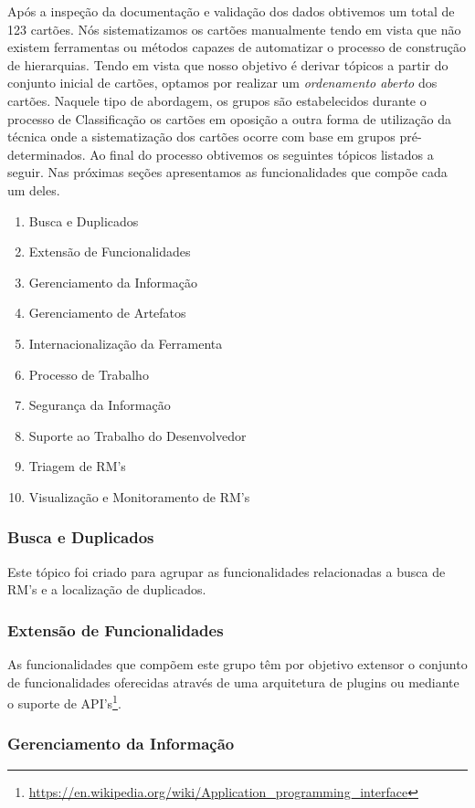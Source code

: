 Após a inspeção da documentação e validação dos dados obtivemos um total de 123
cartões. Nós sistematizamos os cartões manualmente tendo em vista que não
existem ferramentas ou métodos capazes de automatizar o processo de construção
de hierarquias. Tendo em vista que nosso objetivo é derivar tópicos a partir do
conjunto inicial de cartões, optamos por realizar um \textit{ordenamento aberto}
dos cartões.  Naquele tipo de abordagem, os grupos são estabelecidos durante o
processo de Classificação os cartões em oposição a outra forma de utilização da
técnica onde a sistematização dos cartões ocorre com base em grupos
pré-determinados.  Ao final do processo obtivemos os seguintes tópicos listados
a seguir. Nas próximas seções apresentamos as funcionalidades que compõe cada um
deles.

\begin{enumerate}
	\item{Busca e Duplicados}
	\item{Extensão de Funcionalidades}
	\item{Gerenciamento da Informação}
	\item{Gerenciamento de Artefatos}
	\item{Internacionalização da Ferramenta}
	\item{Processo de Trabalho}
	\item{Segurança da Informação}
	\item{Suporte ao Trabalho do Desenvolvedor}
	\item{Triagem de RM's}
	\item{Visualização e Monitoramento de RM's}
\end{enumerate}

\subsubsection{Busca e Duplicados}

Este tópico foi criado para agrupar as funcionalidades relacionadas a busca de
RM's e a localização de duplicados.
\subsubsection{Extensão de Funcionalidades}

As funcionalidades que compõem este grupo têm por objetivo extensor o conjunto
de funcionalidades oferecidas através de uma arquitetura de plugins ou mediante
o suporte de
API's\footnote{\url{https://en.wikipedia.org/wiki/Application_programming_interface}}.
\subsubsection{Gerenciamento da Informação}

